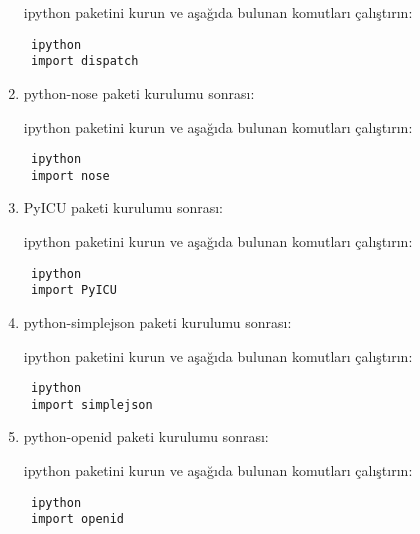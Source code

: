 \documentclass[a4paper,10pt]{article}
\begin{document}
\begin{enumerate}
ipython paketini kurun ve aşağıda bulunan komutları çalıştırın:
\begin{verbatim}
 ipython
 import dispatch
\end{verbatim}

\item python-nose paketi kurulumu sonrası:  

ipython paketini kurun ve aşağıda bulunan komutları çalıştırın:
\begin{verbatim}
 ipython
 import nose
\end{verbatim}

\item PyICU paketi kurulumu sonrası:  

ipython paketini kurun ve aşağıda bulunan komutları çalıştırın:
\begin{verbatim}
 ipython
 import PyICU
\end{verbatim}

\item python-simplejson paketi kurulumu sonrası:  

ipython paketini kurun ve aşağıda bulunan komutları çalıştırın:
\begin{verbatim}
 ipython
 import simplejson
\end{verbatim}
\item python-openid paketi kurulumu sonrası:  

ipython paketini kurun ve aşağıda bulunan komutları çalıştırın:
\begin{verbatim}
 ipython
 import openid
\end{verbatim}


\end{enumerate}
\end{document}
